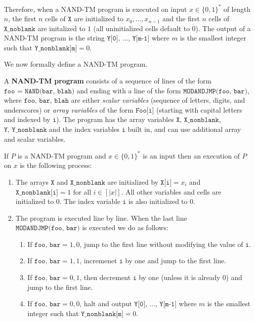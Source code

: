 \documentclass{article}
\begin{document}
\begin{enumerate}
  \end{enumerate}
  Therefore, when a NAND-TM program is executed on input $x \in \{0,1\}^*$ of length $n$, the first $n$ cells of $\texttt{X}$ are initialized to $x_0, ..., x_{n-1}$ and the first $n$ cells of $\texttt{X\_noblank}$ are initalized to $1$ (all uninitialized cells default to $0$). The output of a NAND-TM program is the string $\texttt{Y[0], ..., Y[m-1]}$ where $m$ is the smallest integer such that $\texttt{Y\_nonblank[m]} = 0$. 

  We now formally define a NAND-TM program. 

  \begin{definition}
  A \textbf{NAND-TM program} consists of a sequence of lines of the form $\texttt{foo = NAND(bar, blah)}$ and ending with a line of the form $\texttt{MODANDJMP(foo, bar)}$, where $\texttt{foo, bar, blah}$ are either \textit{scalar variables} (sequence of letters, digits, and underscores) or \textit{array variables} of the form $\texttt{Foo[i]}$ (starting with capital letters and indexed by $\texttt{i}$). The program has the array variables $\texttt{X, X\_nonblank}$, $\texttt{Y, Y\_nonblank}$ and the index variables $\texttt{i}$ built in, and can use additional array and scalar variables. 

  If $P$ is a NAND-TM program and $x \in \{0,1\}^*$ is an input then an execution of $P$ on $x$ is the following process: 
  \begin{enumerate}
      \item The arrays $\texttt{X}$ and $\texttt{X\_nonblank}$ are initialized by $\texttt{X[i]} = x_i$ and $\texttt{X\_nonblank[i]} = 1$ for all $i \in [|x|]$. All other variables and cells are initialized to $0$. The index variable $\texttt{i}$ is also initialized to $0$. 
      \item The program is executed line by line. When the last line $\texttt{MODANDJMP(foo, bar)}$ is executed we do as follows: 
      \begin{enumerate}
          \item If $\texttt{foo, bar} = 1, 0$, jump to the first line without modifying the value of $\texttt{i}$. 
          \item If $\texttt{foo, bar} = 1, 1$, incremenet $\texttt{i}$ by one and jump to the first line. 
          \item If $\texttt{foo, bar} = 0, 1 $, then decrement $\texttt{i}$ by one (unless it is already 0) and jump to the first line. 
          \item If $\texttt{foo, bar} = 0, 0$, halt and output $\texttt{Y[0], ..., Y[m-1]}$ where $m$ is the smallest integer such that $\texttt{Y\_nonblank[m]} = 0$. 
      \end{enumerate}
  \end{enumerate}
  \end{definition}
\end{document}
